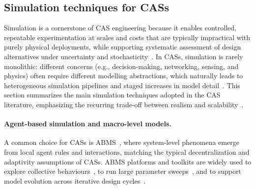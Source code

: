 \documentclass[runningheads]{llncs}
\begin{document}
\subsection{Simulation techniques for \acp{CAS}}\label{sec:simulation-techniques}

Simulation is a cornerstone of \ac{CAS} engineering because it enables controlled,
repeatable experimentation at scales and costs that are typically impractical with purely physical deployments,
while supporting systematic assessment of design alternatives under uncertainty and stochasticity~\cite{MittalRiscoMartin2017SimBasedCAS,DBLP:journals/jos/Sargent13}.
%
In \acp{CAS}, simulation is rarely monolithic:
different concerns (e.g., decision-making, networking, sensing, and physics)
often require different modelling abstractions,
which naturally leads to heterogeneous simulation pipelines and staged increases in model detail~\cite{DBLP:journals/csur/GomesTBLV18}.
%
This section summarizes the main simulation techniques adopted in the \ac{CAS} literature,
emphasizing the recurring trade-off between realism and scalability~\cite{DBLP:journals/isci/Schut10}.

\paragraph{Agent-based simulation and macro-level models.}
A common choice for \acp{CAS} is \ac{ABMS}~\cite{DBLP:journals/csr/AbarTLO17},
where system-level phenomena emerge from local agent rules and interactions,
matching the typical decentralization and adaptivity assumptions of \acp{CAS}.
%
\ac{ABMS} platforms and toolkits are widely used to explore collective behaviours~\cite{DBLP:journals/simulation/LukeCPSB05,North2013RepastSimphony},
to run large parameter sweeps~\cite{DBLP:conf/hpcs/PianiniSV14},
and to support model evolution across iterative design cycles~\cite{DBLP:journals/jos/PianiniMV13}.
%
\end{document}
